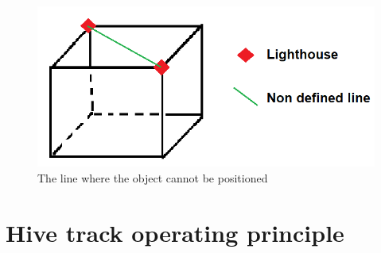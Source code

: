 \documentclass{vldb}
\begin{document}
\begin{figure}
\centering
\includegraphics[width=1.0\columnwidth]{Image/boxundefined.png}
\caption{The line where the object cannot be positioned}
\label{bad}
\end{figure}


\section{Hive track operating principle}
\label{Hive}
\end{document}
